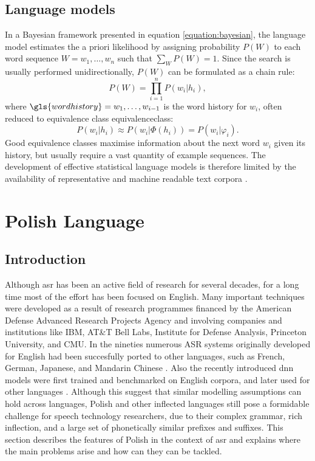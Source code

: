 \subsection{Language models}
\label{subsection:lm}
In a Bayesian framework presented in equation \ref{equation:bayesian}, the language model estimates the a priori likelihood by assigning probability $P(W)$ to each word sequence $W=w_{1}, \ldots, w_{n}$ such that $\sum_{W}P(W)=1$. Since the search is usually performed unidirectionally, $P(W)$ can be formulated as a chain rule:
\begin{equation}
\label{equation:chain}
  P(W)=\prod^{n}_{i=1}P(w_{i}|h_{i}),
\end{equation}
where $\gls{wordhistory}=w_{1}, \ldots, w_{i-1}$ is the word history for $w_{i}$, often reduced to equivalence class \gls{equivalenceclass}:
\begin{equation}
	P(w_{i}|h_{i})\approx P(w_{i}|\Phi(h_{i}))=P(w_{i}|\varphi_{i}).
\end{equation}
Good equivalence classes maximise information about the next word $w_{i}$ given its history, but usually require a vast quantity of example sequences. The development of effective statistical language models is therefore limited by the availability of representative and machine readable text corpora \cite{rosenfeld2000two}.

\section{Polish Language}
\label{section:polish}
\subsection{Introduction}
Although \gls{asr} has been an active field of research for several decades, for a long time most of the effort has been focused on English.  Many important techniques were developed as a result of research programmes financed by the American Defense Advanced Research Projects Agency and involving companies and institutions like IBM, AT\&T Bell Labs, Institute for Defense Analysis, Princeton University, and CMU. In the nineties numerous ASR systems originally developed for English had been succesfully ported to other languages, such as French, German, Japanese, and Mandarin Chinese \cite{besacier2014automatic}. Also the recently introduced \gls{dnn} models were first trained and benchmarked on English corpora, and later used for other languages \cite{hinton2012deep}. Although this suggest that similar modelling assumptions can hold across languages, Polish and other inflected languages still pose a formidable challenge for speech technology researchers, due to their complex grammar, rich inflection, and a large set of phonetically similar prefixes and suffixes. This section describes the features of Polish in the context of \gls{asr} and explains where the main problems arise and how can they can be tackled.
